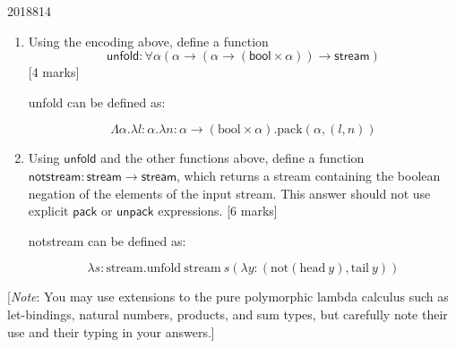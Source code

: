 \documentclass[10pt,\jkfside,a4paper]{article}
\newcommand{\answer}[1]{
    \begin{tcolorbox}[colframe=black, colback=white, sharp corners, boxrule=0.2mm, breakable]
        #1
    \end{tcolorbox}
}
\newcommand{\qmarks}[1]{\hspace*{\fill}[#1]}
\begin{document}
\begin{examquestion}{2018}{8}{14}
\begin{enumerate}
\begin{enumerate}
                \item
                    Using the encoding above, define a function
                    \[
                        \mathsf{unfold} : \forall\alpha(\alpha \to (\alpha \to (\mathsf{bool} \times \alpha)) \to \mathsf{stream})
                    \]
                    \qmarks{4 marks}

                    \answer{ 
                        unfold can be defined as: 

                        \[
                            \Lambda \alpha . \lambda l: \alpha . \lambda n : \alpha \to (\text{bool} \times \alpha) . \text{pack}(\alpha, (l, n))
                        \]
                    }

                \item
                    Using $\mathsf{unfold}$ and the other functions above, define a
                    function $\mathsf{notstream} : \mathsf{stream} \to \mathsf{stream}$,
                    which returns a stream containing the boolean negation of the elements
                    of the input stream. This answer should not use explicit
                    $\mathsf{pack}$ or $\mathsf{unpack}$ expressions. \qmarks{6 marks}

                    \answer{ 
                        notstream can be defined as: 

                        \[ 
                            \lambda s : \text{stream} . \text{unfold} \ \text{stream} \ s (\lambda y: (\text{not}(\text{head} \ y), \text{tail} \ y))
                        \]
                    }

            \end{enumerate}

    \end{enumerate}

    [\textit{Note}: You may use extensions to the pure polymorphic lambda calculus such
    as let-bindings, natural numbers, products, and sum types, but carefully note their
    use and their typing in your answers.]

\end{examquestion}
\end{document}
